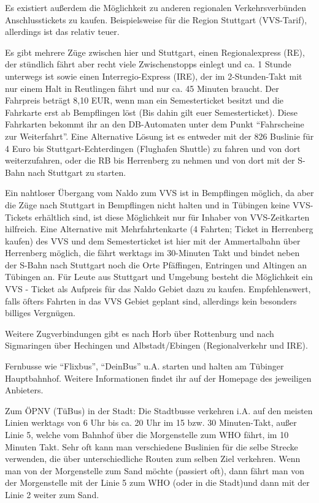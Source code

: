Es existiert außerdem die Möglichkeit zu anderen regionalen Verkehrsverbünden Anschlusstickets zu kaufen.
Beispielsweise für die Region Stuttgart (VVS-Tarif), allerdings ist das relativ teuer.

Es gibt mehrere Züge zwischen hier und Stuttgart, einen
  Regionalexpress (RE), der stündlich fährt aber recht viele
  Zwischenstopps einlegt und ca. 1 Stunde unterwegs ist sowie einen
  Interregio-Express (IRE), der im 2-Stunden-Takt mit nur einem Halt
  in Reutlingen fährt und nur ca. 45 Minuten braucht.
  Der Fahrpreis beträgt 8,10 EUR, wenn man ein Semesterticket
  besitzt und die Fahrkarte erst ab Bempflingen löst (Bis dahin gilt euer Semesterticket).
  Diese Fahrkarten bekommt ihr an den DB-Automaten unter dem Punkt "`Fahrscheine zur Weiterfahrt"'.
Eine Alternative Lösung ist es entweder mit der 826 Buslinie für 4 Euro bis Stuttgart-Echterdingen (Flughafen Shuttle) zu fahren und von dort weiterzufahren, oder die RB bis Herrenberg zu nehmen und von dort mit der S-Bahn nach Stuttgart zu starten.


Ein nahtloser Übergang vom Naldo zum VVS ist in Bempflingen
  möglich, da aber die Züge nach Stuttgart in Bempflingen nicht halten und in
  Tübingen keine VVS-Tickets erhältlich sind, ist diese Möglichkeit nur für
  Inhaber von VVS-Zeitkarten hilfreich. Eine Alternative mit Mehrfahrtenkarte
  (4 Fahrten; Ticket in Herrenberg kaufen) des VVS und dem Semesterticket
  ist hier mit der Ammertalbahn
  über Herrenberg möglich, die fährt werktags im 30-Minuten Takt und
  bindet neben der S-Bahn nach Stuttgart noch die Orte Pfäffingen, Entringen
  und Altingen an Tübingen an. Für Leute aus Stuttgart und Umgebung besteht die Möglichkeit ein VVS - Ticket als Aufpreis für das Naldo Gebiet dazu zu kaufen.
 Empfehlenswert, falls öfters Fahrten in das VVS Gebiet geplant sind, allerdings kein besonders billiges Vergnügen.

Weitere Zugverbindungen gibt es nach Horb über Rottenburg
  und nach Sigmaringen über Hechingen und Albstadt/Ebingen (Regionalverkehr und IRE).

Fernbusse wie "`Flixbus"', "`DeinBus"' u.A. starten und halten am Tübinger Hauptbahnhof. Weitere Informationen findet ihr auf der Homepage
des jeweiligen Anbieters.

Zum ÖPNV (TüBus) in der Stadt: Die Stadtbusse verkehren i.A. auf
  den meisten Linien werktags von 6 Uhr bis ca. 20 Uhr im 15 bzw. 30 Minuten-Takt,
  außer Linie 5, welche vom Bahnhof über die Morgenstelle zum WHO fährt, im 10
  Minuten Takt. Sehr oft kann man verschiedene Buslinien für die selbe Strecke
  verwenden, die über unterschiedliche Routen zum selben Ziel verkehren.
  Wenn man von der Morgenstelle zum Sand möchte (passiert oft), dann
  fährt man von der Morgenstelle mit der Linie 5
  zum WHO (oder in die Stadt)und dann mit der Linie 2 weiter zum Sand.


